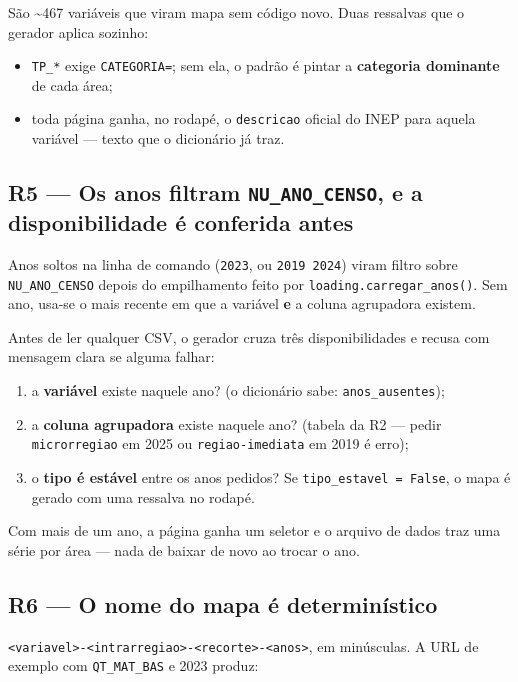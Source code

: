 \documentclass[11pt]{article}
\begin{document}
São \textasciitilde{}467 variáveis que viram mapa sem código novo. Duas ressalvas que o
gerador aplica sozinho:

\begin{itemize}
\item \texttt{TP\_*} exige \texttt{CATEGORIA=}; sem ela, o padrão é pintar a \textbf{categoria
dominante} de cada área;
\item toda página ganha, no rodapé, o \texttt{descricao} oficial do INEP para aquela
variável — texto que o dicionário já traz.
\end{itemize}
\subsection{R5 — Os anos filtram \texttt{NU\_ANO\_CENSO}, e a disponibilidade é conferida antes}
\label{sec:org50e77ba}

Anos soltos na linha de comando (\texttt{2023}, ou \texttt{2019 2024}) viram filtro sobre
\texttt{NU\_ANO\_CENSO} depois do empilhamento feito por \texttt{loading.carregar\_anos()}.
Sem ano, usa-se o mais recente em que a variável \textbf{e} a coluna agrupadora
existem.

Antes de ler qualquer CSV, o gerador cruza três disponibilidades e recusa
com mensagem clara se alguma falhar:

\begin{enumerate}
\item a \textbf{variável} existe naquele ano? (o dicionário sabe: \texttt{anos\_ausentes});
\item a \textbf{coluna agrupadora} existe naquele ano? (tabela da R2 — pedir
\texttt{microrregiao} em 2025 ou \texttt{regiao-imediata} em 2019 é erro);
\item o \textbf{tipo é estável} entre os anos pedidos? Se
\texttt{tipo\_estavel = False}, o mapa é gerado com uma ressalva no rodapé.
\end{enumerate}

Com mais de um ano, a página ganha um seletor e o arquivo de dados traz uma
série por área — nada de baixar de novo ao trocar o ano.
\subsection{R6 — O nome do mapa é determinístico}
\label{sec:orgba1002e}

\texttt{<variavel>-<intrarregiao>-<recorte>-<anos>}, em minúsculas. A URL de
exemplo com \texttt{QT\_MAT\_BAS} e 2023 produz:
\end{document}
